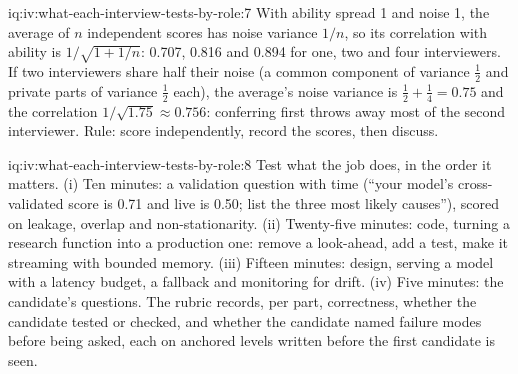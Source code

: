 \begin{solution}{iq:iv:what-each-interview-tests-by-role:7}
With ability spread 1 and noise 1, the average of $n$ independent scores has noise variance $1/n$, so its
correlation with ability is $1/\sqrt{1 + 1/n}$: 0.707, 0.816 and 0.894 for one, two and four interviewers.
If two interviewers share half their noise (a common component of variance $\tfrac12$ and private parts of
variance $\tfrac12$ each), the average's noise variance is $\tfrac12 + \tfrac14 = 0.75$ and the correlation
$1/\sqrt{1.75} \approx 0.756$: conferring first throws away most of the second interviewer. Rule: score
independently, record the scores, then discuss.
\end{solution}

\begin{solution}{iq:iv:what-each-interview-tests-by-role:8}
Test what the job does, in the order it matters. (i) Ten minutes: a validation question with time (``your
model's cross-validated score is 0.71 and live is 0.50; list the three most likely causes''), scored on
leakage, overlap and non-stationarity. (ii) Twenty-five minutes: code, turning a research function into a
production one: remove a look-ahead, add a test, make it streaming with bounded memory. (iii) Fifteen minutes:
design, serving a model with a latency budget, a fallback and monitoring for drift. (iv) Five minutes: the
candidate's questions. The rubric records, per part, correctness, whether the candidate tested or checked,
and whether the candidate named failure modes before being asked, each on anchored levels written before the
first candidate is seen.
\end{solution}
